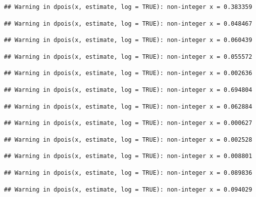 \documentclass[]{article}
\begin{document}
\begin{verbatim}
## Warning in dpois(x, estimate, log = TRUE): non-integer x = 0.383359
\end{verbatim}

\begin{verbatim}
## Warning in dpois(x, estimate, log = TRUE): non-integer x = 0.048467
\end{verbatim}

\begin{verbatim}
## Warning in dpois(x, estimate, log = TRUE): non-integer x = 0.060439
\end{verbatim}

\begin{verbatim}
## Warning in dpois(x, estimate, log = TRUE): non-integer x = 0.055572
\end{verbatim}

\begin{verbatim}
## Warning in dpois(x, estimate, log = TRUE): non-integer x = 0.002636
\end{verbatim}

\begin{verbatim}
## Warning in dpois(x, estimate, log = TRUE): non-integer x = 0.694804
\end{verbatim}

\begin{verbatim}
## Warning in dpois(x, estimate, log = TRUE): non-integer x = 0.062884
\end{verbatim}

\begin{verbatim}
## Warning in dpois(x, estimate, log = TRUE): non-integer x = 0.000627
\end{verbatim}

\begin{verbatim}
## Warning in dpois(x, estimate, log = TRUE): non-integer x = 0.002528
\end{verbatim}

\begin{verbatim}
## Warning in dpois(x, estimate, log = TRUE): non-integer x = 0.008801
\end{verbatim}

\begin{verbatim}
## Warning in dpois(x, estimate, log = TRUE): non-integer x = 0.089836
\end{verbatim}

\begin{verbatim}
## Warning in dpois(x, estimate, log = TRUE): non-integer x = 0.094029
\end{verbatim}
\end{document}
